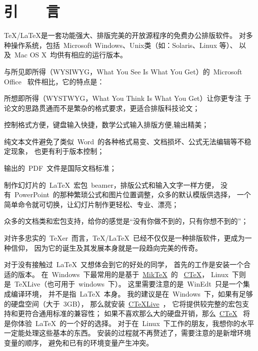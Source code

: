 \chapter*{\hfill 引　　言 \hfill}
\label{chap00:introduction}

\TeX/\LaTeX 是一套功能强大、排版完美的开放源程序的免费办公排版软件。
对多种操作系统，包括~Microsoft Windows、Unix类（如：Solaris、Linux 等）、
以及~Mac OS X~均供有相应的运行版本。

与所见即所得（WYSIWYG，What You See Is What You Get）的~Microsoft Office~
软件相比，它的特点是：
\begin{asparaenum}
    \item 所想即所得（WYSTWYG，What You Think Is What You Get）让你更专注
        于论文的思路贯通而不是繁杂的格式要求，更适合排版科技论文；
    \item 控制格式方便，键盘输入快捷，数学公式输入排版方便,输出精美；
    \item 纯文本文件避免了类似~Word~的各种格式易变、文档损坏、公式无法编辑等不稳定现象，
      也更有利于版本控制；
    \item 输出的~PDF~文件是国际文档标准；
    \item 制作幻灯片的~\LaTeX~宏包~beamer，排版公式和输入文字一样方便，
        没有~PowerPoint~的那种繁琐公式和图片位置调整，众多的默认模版供选择，
        一个简单命令就可切换，让幻灯片制作更轻松、专业、漂亮；
    \item 众多的文档类和宏包支持，给你的感觉是“没有你做不到的，只有你想不到的”；
    \item 对许多忠实的~\TeX{}er~而言，\TeX/\LaTeX~已经不仅仅是一种排版软件，更成为一种信仰，
        因为它的诞生及其发展本身就是一段趋向完美的传奇。
\end{asparaenum}

对于没有接触过~\LaTeX~又想体会到它的好处的同学，
首先的工作是安装一个合适的版本。
在~Windows~下最常用的是基于~\href{http://www.miktex.org}{MikTeX}~的
~\href{http://www.ctex.org/CTeXDownload}{CTeX}，
Linux~下则是~TeXLive（也可用于~windows~下）。
这里需要注意的是~WinEdt~只是一个集成编译环境，
并不是指~\LaTeX~本身。
我的建议是在~Windows~下，如果有足够的硬盘空间（大于~3GB），
那么就安装~\href{http://thinfilm.ustc.edu.cn/~liangzi/software/CTeXlive/}{CTeXLive}~，
它将提供较完整的宏包支持和更符合通用标准的兼容性；
如果不喜欢那么大的硬盘开销，那么~\href{http://www.ctex.org/CTeXDownload}{CTeX}~
将是你体验~\LaTeX~的一个好的选择。
对于在~Linux~下工作的朋友，我想你的水平一定能处理这些基本的东西。
安装的过程就不再赘述了，需要注意的是新增环境变量的顺序，
避免和已有的环境变量产生冲突。

